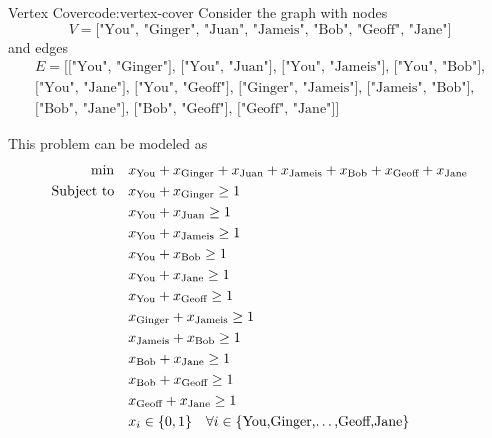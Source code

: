 \documentclass[../open-optimization/open-optimization.tex]{subfiles}
\begin{document}
\begin{examplewithcode}{Vertex Cover}{code:vertex-cover}
\label{example:vertex-cover}
Consider the graph with nodes
\begin{equation}
V = \text{["You", "Ginger", "Juan", "Jameis", "Bob", "Geoff", "Jane"]}
\end{equation}
and edges
\begin{align}E = \text{[["You", "Ginger"],
     ["You", "Juan"], 
     ["You", "Jameis"],
     ["You", "Bob"],}\\
     \text{["You", "Jane"],
     ["You", "Geoff"],
     ["Ginger", "Jameis"],
     ["Jameis", "Bob"],}\\
     \text{
     ["Bob", "Jane"],
     ["Bob", "Geoff"],
     ["Geoff", "Jane"]]}
  \end{align}
  
This problem can be modeled as
\begin{alignat*}{1}\min\quad & x_{\text{You}} + x_{\text{Ginger}} + x_{\text{Juan}} + x_{\text{Jameis}} + x_{\text{Bob}} + x_{\text{Geoff}} + x_{\text{Jane}}\\
\text{Subject to} \quad & x_{\text{You}} + x_{\text{Ginger}} \geq 1\\
 & x_{\text{You}} + x_{\text{Juan}} \geq 1\\
 & x_{\text{You}} + x_{\text{Jameis}} \geq 1\\
 & x_{\text{You}} + x_{\text{Bob}} \geq 1\\
 & x_{\text{You}} + x_{\text{Jane}} \geq 1\\
 & x_{\text{You}} + x_{\text{Geoff}} \geq 1\\
 & x_{\text{Ginger}} + x_{\text{Jameis}} \geq 1\\
 & x_{\text{Jameis}} + x_{\text{Bob}} \geq 1\\
 & x_{\text{Bob}} + x_{\text{Jane}} \geq 1\\
 & x_{\text{Bob}} + x_{\text{Geoff}} \geq 1\\
 & x_{\text{Geoff}} + x_{\text{Jane}} \geq 1\\
 & x_{i} \in \{0,1\} \quad\forall i \in \{\text{You,Ginger,\dots,Geoff,Jane}\}\\
\end{alignat*}
\end{examplewithcode}
\end{document}

